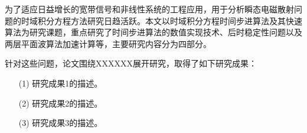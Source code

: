 \documentclass{standalone}
\begin{document}
	
\begin{chineseabstract}

为了适应日益增长的宽带信号和非线性系统的工程应用，用于分析瞬态电磁散射问题的时域积分方程方法研究日趋活跃。本文以时域积分方程时间步进算法及其快速算法为研究课题，重点研究了时间步进算法的数值实现技术、后时稳定性问题以及两层平面波算法加速计算等，主要研究内容分为四部分。

针对这些问题，论文围绕XXXXXX展开研究，取得了如下研究成果：
\begin{enumerate}[labelsep = .5em, leftmargin = 0pt, itemindent = 3.8em]
\item[(1)]
研究成果1的描述。
\item[(2)]
研究成果2的描述。
\item[(3)]
研究成果3的描述。
\end{enumerate}

\end{chineseabstract}
\end{document}
